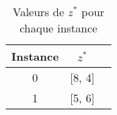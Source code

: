 \documentclass[10pt,a4paper]{report}
\begin{document}
\begin{table}[h!]
\centering
\begin{tabular}{|c|c|c|}
\hline
Instance & \( z^* \) \\
\hline
0 & [8, 4] \\
1 & [5, 6] \\
\hline
\end{tabular}
\caption{Valeurs de \( z^* \) pour chaque instance}
\label{tab:z_star}
\end{table}
\end{document}
